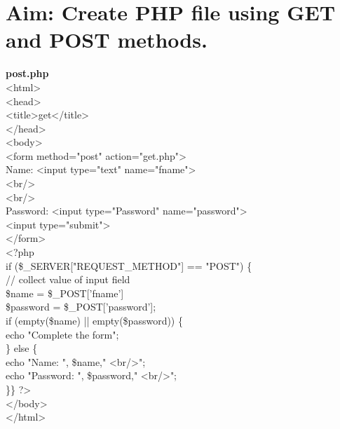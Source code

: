 \section*{\fontsize{16}{14}\selectfont Aim: Create PHP file using GET and POST methods.}
\textbf{post.php}\\ 
<html>\\
<head>\\
<title>get</title>\\
</head>\\
<body>\\
<form method="post" action="get.php">\\
  Name: <input type="text" name="fname">\\
  <br/>\\
  <br/>\\
  Password: <input type="Password" name="password">\\
  <input type="submit">\\
</form>\\
<?php\\
if (\$\_SERVER["REQUEST\_METHOD"] == "POST") \{\\
    // collect value of input field\\
    \$name = \$\_POST['fname']\\
    \$password = \$\_POST['password'];\\
    if (empty(\$name) || empty(\$password)) \{ \\
        echo "Complete the form";\\
    \} else \{ \\
        echo "Name: ", \$name," <br/>";\\
        echo "Password: ", \$password," <br/>";\\
    \}\} ?>\\
</body>\\
</html>\\
\newpage
